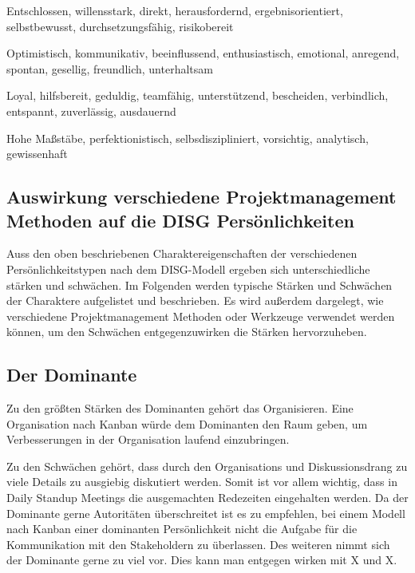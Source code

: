 \documentclass[twocolumn,10pt]{asme2ej}
\begin{document}
\begin{description}[align=left]
	\item [Dominant] Entschlossen, willensstark, direkt, herausfordernd, ergebnisorientiert, selbstbewusst, durchsetzungsfähig, risikobereit
	\item [Initiativ] Optimistisch, kommunikativ, beeinflussend, enthusiastisch, emotional, anregend, spontan, gesellig, freundlich, unterhaltsam
	\item [Stetig] Loyal, hilfsbereit, geduldig, teamfähig, unterstützend, bescheiden, verbindlich, entspannt, zuverlässig, ausdauernd
	\item [Gewissenhaft] Hohe Maßstäbe, perfektionistisch, selbsdiszipliniert, vorsichtig, analytisch, gewissenhaft \cite{disg_charakteristika}
\end{description}

\subsection{Auswirkung verschiedene Projektmanagement Methoden auf die DISG Persönlichkeiten}
Auss den oben beschriebenen Charaktereigenschaften der verschiedenen Persönlichkeitstypen nach dem DISG-Modell ergeben sich unterschiedliche stärken und schwächen. Im Folgenden werden typische Stärken und Schwächen der Charaktere aufgelistet und beschrieben. Es wird außerdem dargelegt, wie verschiedene Projektmanagement Methoden oder Werkzeuge verwendet werden können, um den Schwächen entgegenzuwirken die Stärken hervorzuheben.

\subsection{Der Dominante}
Zu den größten Stärken des Dominanten gehört das Organisieren. Eine Organisation nach Kanban würde dem Dominanten den Raum geben, um Verbesserungen in der Organisation laufend einzubringen.

Zu den Schwächen gehört, dass durch den Organisations und Diskussionsdrang zu viele Details zu ausgiebig diskutiert werden. Somit ist vor allem wichtig, dass in Daily Standup Meetings die ausgemachten Redezeiten eingehalten werden. Da der Dominante gerne Autoritäten überschreitet ist es zu empfehlen, bei einem Modell nach Kanban einer dominanten Persönlichkeit nicht die Aufgabe für die Kommunikation mit den Stakeholdern zu überlassen. Des weiteren nimmt sich der Dominante gerne zu viel vor. Dies kann man entgegen wirken mit X und X.
\end{document}
